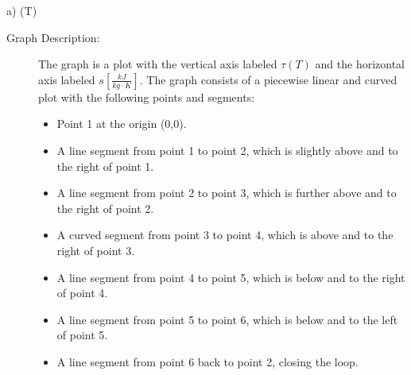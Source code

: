 a) \quad \tau (T)

\begin{description}
\item[Graph Description:] 
The graph is a plot with the vertical axis labeled \(\tau (T)\) and the horizontal axis labeled \(s \left[ \frac{kJ}{kg \cdot K} \right]\). The graph consists of a piecewise linear and curved plot with the following points and segments:
\begin{itemize}
    \item Point 1 at the origin (0,0).
    \item A line segment from point 1 to point 2, which is slightly above and to the right of point 1.
    \item A line segment from point 2 to point 3, which is further above and to the right of point 2.
    \item A curved segment from point 3 to point 4, which is above and to the right of point 3.
    \item A line segment from point 4 to point 5, which is below and to the right of point 4.
    \item A line segment from point 5 to point 6, which is below and to the left of point 5.
    \item A line segment from point 6 back to point 2, closing the loop.
\end{itemize}
\end{description}